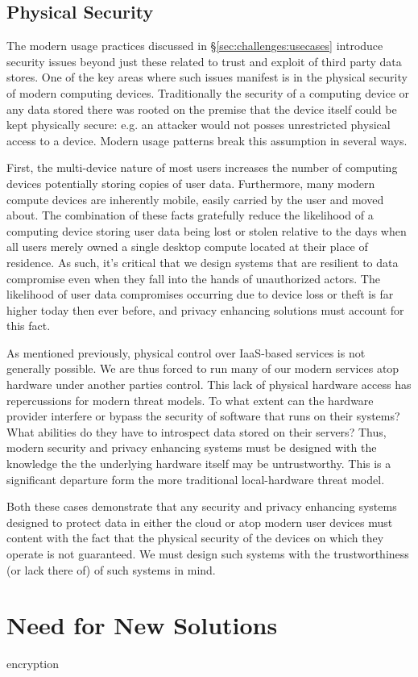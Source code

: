 \subsection{Physical Security}

The modern usage practices discussed in
\S\ref{sec:challenges:usecases} introduce security issues beyond just
these related to trust and exploit of third party data stores. One of
the key areas where such issues manifest is in the physical security
of modern computing devices. Traditionally the security of a computing
device or any data stored there was rooted on the premise that the
device itself could be kept physically secure: e.g. an attacker would
not posses unrestricted physical access to a device. Modern usage
patterns break this assumption in several ways.

First, the multi-device nature of most users increases the number of
computing devices potentially storing copies of user
data. Furthermore, many modern compute devices are inherently mobile,
easily carried by the user and moved about. The combination of these
facts gratefully reduce the likelihood of a computing device storing
user data being lost or stolen relative to the days when all users
merely owned a single desktop compute located at their place of
residence. As such, it's critical that we design systems that are
resilient to data compromise even when they fall into the hands of
unauthorized actors. The likelihood of user data compromises occurring
due to device loss or theft is far higher today then ever before, and
privacy enhancing solutions must account for this fact.

As mentioned previously, physical control over IaaS-based services is
not generally possible. We are thus forced to run many of our modern
services atop hardware under another parties control. This lack of
physical hardware access has repercussions for modern threat
models. To what extent can the hardware provider interfere or bypass
the security of software that runs on their systems? What abilities do
they have to introspect data stored on their servers? Thus, modern
security and privacy enhancing systems must be designed with the
knowledge the the underlying hardware itself may be
untrustworthy. This is a significant departure form the more
traditional local-hardware threat model.

Both these cases demonstrate that any security and privacy enhancing
systems designed to protect data in either the cloud or atop modern
user devices must content with the fact that the physical security of
the devices on which they operate is not guaranteed. We must design
such systems with the trustworthiness (or lack there of) of such
systems in mind.

\section{Need for New Solutions}

encryption


